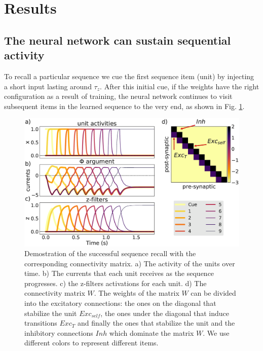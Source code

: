 \documentclass{esannV2}
\begin{document}
\section{Results}

\subsection{The neural network can sustain sequential activity}

To recall a particular sequence we cue the first sequence item (unit) by injecting a short input lasting around $\tau_z$. After this initial cue, if the weights have the right configuration as a result of training, the neural network continues to visit subsequent items in the learned sequence to the very
end, as shown in Fig. \ref{Fig:recall}. 


\begin{figure}[h!]
\centering
\includegraphics[scale=0.20]{recall.eps}
\caption{Demostration of the successful sequence recall with the corresponding connectivity matrix. a) The activity of the units over time. b) The currents that each unit receives as the sequence progresses. c) the z-filters activations for each unit. d) The connectivity matrix $W$. The weights of the matrix $W$ can be divided into the excitatory connections: the ones on the diagonal that stabilize the unit $Exc_{self}$, the ones under the diagonal that induce transitions $Exc_{T}$ and finally the ones that stabilize the unit  and the inhibitory connections $Inh$ which dominate the matrix $W$. We use different colors to represent different items. }\label{Fig:recall}
\end{figure}
\end{document}
